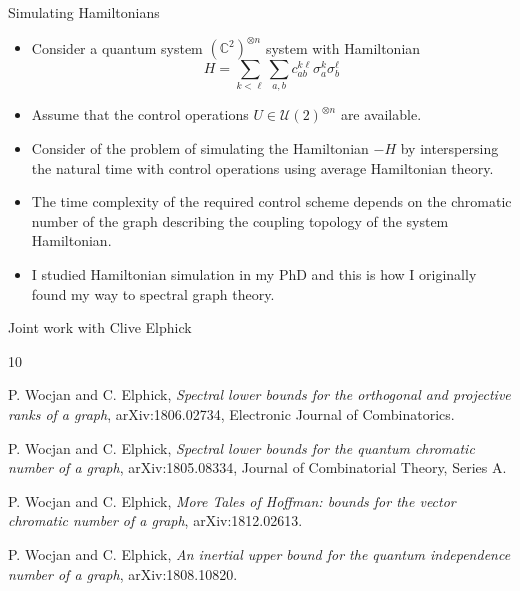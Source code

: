 \documentclass{beamer}
\renewcommand{\>}{\rangle}
\newcommand{\<}{\langle}
\begin{document}
%

\begin{frame}{Simulating Hamiltonians}

\begin{itemize}
    \item Consider a quantum system $({\mathbb{C}^2})^{\otimes n}$ system with Hamiltonian
    \begin{equation*}
        H = \sum_{k<\ell} \sum_{a, b} c_{ab}^{k\ell} \sigma_a^k \sigma_b^\ell
    \end{equation*}
    
    \item Assume that the control operations $U\in\mathcal{U}(2)^{\otimes n}$ are available. 
    
    \item Consider of the problem of simulating the Hamiltonian $-H$ by interspersing the natural time with control operations using average Hamiltonian theory.
    
    \item The time complexity of the required control scheme depends on the chromatic number of the graph describing the coupling topology of the system Hamiltonian.
    
    \item I studied Hamiltonian simulation in my PhD and this is how I originally found my way to spectral graph theory.
\end{itemize}

\end{frame}

%

\begin{frame}{Joint work with Clive Elphick}

\begin{thebibliography}{10}

P. Wocjan and C. Elphick, \emph{Spectral lower bounds for the orthogonal and projective ranks of a graph}, arXiv:1806.02734, Electronic Journal of Combinatorics.

P. Wocjan and C. Elphick, \emph{Spectral lower bounds for the quantum chromatic number of a graph},  arXiv:1805.08334, Journal of Combinatorial Theory, Series A.

P. Wocjan and C. Elphick, \emph{More Tales of Hoffman: bounds for the vector chromatic number of a graph}, arXiv:1812.02613.

P. Wocjan and C. Elphick, \emph{An inertial upper bound for the quantum independence number of a graph},  arXiv:1808.10820.
\end{thebibliography}

\end{frame}

% 
\end{document}

